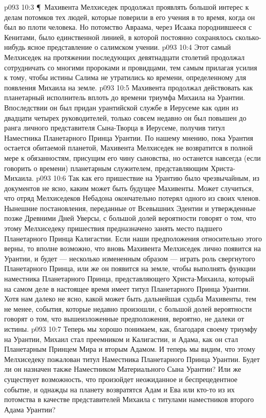 \vs p093 10:3 \P\ Махивента Мелхиседек продолжал проявлять большой интерес к делам потомков тех людей, которые поверили в его учения в то время, когда он был во плоти человека. Но потомство Авраама, через Исаака породнившееся с Кенитами, было единственной линией, в которой постоянно сохранялось сколько\hyp{}нибудь ясное представление о салимском учении.
\vs p093 10:4 Этот самый Мелхиседек на протяжении последующих девятнадцати столетий продолжал сотрудничать со многими пророками и провидцами, тем самым прилагая усилия к тому, чтобы истины Салима не утратились ко времени, определенному для появления Михаила на земле.
\vs p093 10:5 Махивента продолжал действовать как планетарный исполнитель вплоть до времени триумфа Михаила на Урантии. Впоследствии он был придан урантийской службе в Иерусеме как один из двадцати четырех руководителей, только совсем недавно он был повышен до ранга личного представителя Сына\hyp{}Творца в Иерусеме, получив титул Наместника Планетарного Принца Урантии. По нашему мнению, пока Урантия остается обитаемой планетой, Махивента Мелхиседек не возвратится в полной мере к обязанностям, присущим его чину сыновства, но останется навсегда (если говорить о времени) планетарным служителем, представляющим Христа\hyp{}Михаила.
\vs p093 10:6 Так как его пришествие на Урантию было чрезвычайным, из документов не ясно, каким может быть будущее Махивенты. Может случиться, что отряд Мелхиседеков Небадона окончательно потерял одного из своих членов. Нынешние постановления, переданные от Всевышних Эдентии и утвержденные позже Древними Дней Уверсы, с большой долей вероятности говорят о том, что этому Мелхиседеку пришествия предназначено занять место падшего Планетарного Принца Калигастии. Если наши предположения относительно этого верны, то вполне возможно, что вновь Махивента Мелхиседек лично появится на Урантии, и будет --- несколько измененным образом --- играть роль свергнутого Планетарного Принца, или же он появится на земле, чтобы выполнять функции наместника Планетарного Принца, представляющего Христа\hyp{}Михаила, который на самом деле в настоящее время имеет титул Планетарного Принца Урантии. Хотя нам далеко не ясно, какой может быть дальнейшая судьба Махивенты, тем не менее, события, которые недавно произошли, с большой долей вероятности говорят о том, что вышеизложенные предположения, вероятно, не далеки от истины.
\vs p093 10:7 Теперь мы хорошо понимаем, как, благодаря своему триумфу на Урантии, Михаил стал преемником и Калигастии, и Адама, как он стал Планетарным Принцем Мира и вторым Адамом. И теперь мы видим, что этому Мелхиседеку пожалован титул Наместника Планетарного Принца Урантии. Будет ли он назначен также Наместником Материального Сына Урантии? Или же существует возможность, что произойдет неожиданное и беспрецедентное событие, и однажды на планету возвратятся Адам и Ева или кто\hyp{}то из их потомства в качестве представителей Михаила с титулами наместников второго Адама Урантии?
